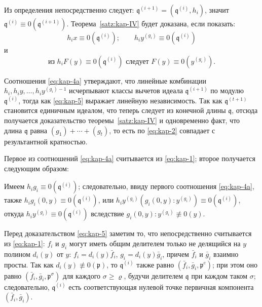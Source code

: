 \documentclass[11pt]{article}
\theoremstyle{plain}
\begin{document}
Из определения непосредственно следует:
$\mathfrak{q}^{(i+1)} = (\mathfrak{q}^{(i)}, h_{i})$, значит
$\mathfrak{q}^{(i)} \equiv 0(\mathfrak{q}^{(i+1)})$.
Теорема~\ref{satz:kap-IV} будет доказана, если показать:
\begin{equation}\label{eq:kap-4a}
h_{i}x \equiv 0(\mathfrak{q}^{(i)}); \qquad
h_{i}y^{(g_{i})} \equiv 0(\mathfrak{q}^{(i)})
\end{equation}
и
\begin{equation}\label{eq:kap-5}
\text{из } h_{i}F(y) \equiv 0(\mathfrak{q}^{(i)})
\text{ следует } F(y) \equiv 0(y^{(g_{i})}).
\end{equation}

Соотношения \eqref{eq:kap-4a} утверждают, что линейные комбинации
$h_{i}, h_{i}y, \ldots, h_{i}y^{(g_{i})-1}$ исчерпывают классы
вычетов идеала $\mathfrak{q}^{(i+1)}$ по модулю
$\mathfrak{q}^{(i)}$, тогда как \eqref{eq:kap-5} выражает линейную
независимость. Так как $\mathfrak{q}^{(t+1)}$ становится единичным
идеалом, что теперь следует из конечной длины $\mathfrak{q}$, отсюда
получается доказательство теоремы~\ref{satz:kap-IV} и одновременно
факт, что длина $\mathfrak{q}$ равна
$(g_{1}) + \cdots + (g_{t})$, то есть по \eqref{eq:kap-2} совпадает
с результантной кратностью.

Первое из соотношений \eqref{eq:kap-4a} считывается из
\eqref{eq:kap-1}; второе получается следующим образом:

Имеем $h_{i}g_{i} \equiv 0(\mathfrak{q}^{(i)})$; следовательно, ввиду
первого соотношения \eqref{eq:kap-4a}, также
$h_{i}g_{i}(0,y) \equiv 0(\mathfrak{q}^{(i)})$, или
$h_{i}y^{(g_{i})}(g_{i}(0,y):y^{(g_{i})}) \equiv 0(\mathfrak{q}^{(i)})$,
откуда $h_{i}y^{(g_{i})} \equiv 0(\mathfrak{q}^{(i)})$
вследствие $g_{i}(0,y):y^{(g_{i})} \not\equiv 0(y)$.

Перед доказательством \eqref{eq:kap-5} заметим то, что
непосредственно считывается из \eqref{eq:kap-1}: $f_{i}$ и $g_{i}$
могут иметь общим делителем только не делящийся на $y$ полином
$d_{i}(y)$ от $y$: $f_{i} = d_{i}(y)\bar{f}_{i}$,
$g_{i} = d_{i}(y)\bar{g}_{i}$, причем $\bar{f}_{i}$ и
$\bar{g}_{i}$ взаимно просты. Так как
$d_{i}(y) \not\equiv 0(\mathfrak{p})$, то
$\mathfrak{q}^{(i)}$ также равно
$(\bar{f}_{i}, \bar{g}_{i}, \mathfrak{p}^{e})$; при этом оно равно
$(\bar{f}_{i}, \bar{g}_{i}, \mathfrak{p}^{\sigma})$ для каждого
$\sigma \geq \varrho$, будучи делителем $\mathfrak{q}$ при каждом
таком $\sigma$; следовательно, $\mathfrak{q}^{(i)}$ есть
соответствующая нулевой точке первичная компонента
$(\bar{f}_{i}, \bar{g}_{i})$.
\end{document}
